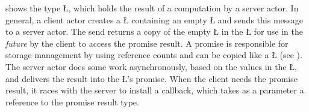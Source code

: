 \documentclass[openright,twoside]{report}
\begin{document}
 shows the type \LGinlinetrue\LGbegin\lgrinde\L{}\endlgrinde\LGend{}, which holds the result of a computation by a server actor.
In general, a client actor creates a \LGinlinetrue\LGbegin\lgrinde\L{}\endlgrinde\LGend{} containing an empty \LGinlinetrue\LGbegin\lgrinde\L{}\endlgrinde\LGend{} and sends this message to a server actor.
The send returns a copy of the empty \LGinlinetrue\LGbegin\lgrinde\L{}\endlgrinde\LGend{} in the \LGinlinetrue\LGbegin\lgrinde\L{}\endlgrinde\LGend{} for use in the \emph{future} by the client to access the promise result.
A promise is responsible for storage management by using reference counts and can be copied like a \LGinlinetrue\LGbegin\lgrinde\L{}\endlgrinde\LGend{} (see ).
The server actor does some work asynchronously, based on the values in the \LGinlinetrue\LGbegin\lgrinde\L{}\endlgrinde\LGend{}, and delivers the result into the \LGinlinetrue\LGbegin\lgrinde\L{}\endlgrinde\LGend{}'s promise.
When the client needs the promise result, it races with the server to install a callback, which takes as a parameter a reference to the promise result type.
\end{document}
